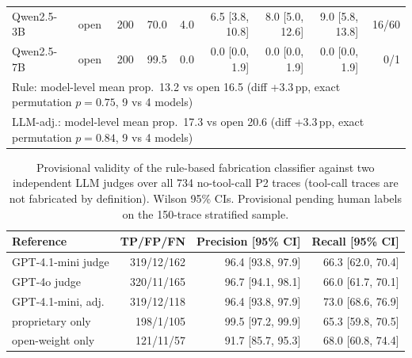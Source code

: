\begin{table}[t]
\begin{tabular}{llrrrrrrr}
Qwen2.5-3B & open & 200 & 70.0 & 4.0 & 6.5 [3.8, 10.8] & 8.0 [5.0, 12.6] & 9.0 [5.8, 13.8] & 16/60 \\
Qwen2.5-7B & open & 200 & 99.5 & 0.0 & 0.0 [0.0, 1.9] & 0.0 [0.0, 1.9] & 0.0 [0.0, 1.9] & 0/1 \\
\midrule
\multicolumn{9}{l}{Rule: model-level mean prop.\ 13.2 vs open 16.5 (diff +3.3\,pp, exact permutation $p=0.75$, 9 vs 4 models)} \\
\multicolumn{9}{l}{LLM-adj.: model-level mean prop.\ 17.3 vs open 20.6 (diff +3.3\,pp, exact permutation $p=0.84$, 9 vs 4 models)} \\
\bottomrule
\end{tabular}
\end{table}

\begin{table}[t]
\centering\small
\caption{Provisional validity of the rule-based fabrication classifier against two independent LLM judges over all 734 no-tool-call P2 traces
(tool-call traces are not fabricated by definition). Wilson 95\% CIs. Provisional pending human labels on the 150-trace stratified sample.}
\label{tab:fab_validity}
\begin{tabular}{lrrr}
\toprule
Reference & TP/FP/FN & Precision [95\% CI] & Recall [95\% CI] \\
\midrule
GPT-4.1-mini judge & 319/12/162 & 96.4 [93.8, 97.9] & 66.3 [62.0, 70.4] \\
GPT-4o judge & 320/11/165 & 96.7 [94.1, 98.1] & 66.0 [61.7, 70.1] \\
GPT-4.1-mini, adj. & 319/12/118 & 96.4 [93.8, 97.9] & 73.0 [68.6, 76.9] \\
\quad proprietary only & 198/1/105 & 99.5 [97.2, 99.9] & 65.3 [59.8, 70.5] \\
\quad open-weight only & 121/11/57 & 91.7 [85.7, 95.3] & 68.0 [60.8, 74.4] \\
\bottomrule
\end{tabular}
\end{table}

